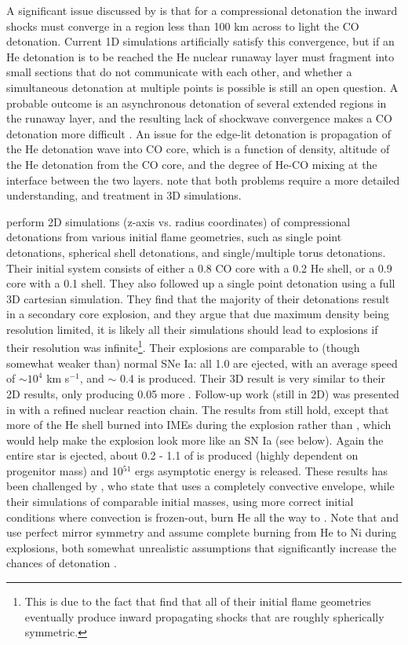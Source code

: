 A significant issue discussed by \citeauthor{woosk10} is that for a compressional detonation the inward shocks must converge in a region less than 100 km across to light the CO detonation.  Current 1D simulations artificially satisfy this convergence, but if an He detonation is to be reached the He nuclear runaway layer must fragment into small sections that do not communicate with each other, and whether a simultaneous detonation at multiple points is possible is still an open question.  A probable outcome is an asynchronous detonation of several extended regions in the runaway layer, and the resulting lack of shockwave convergence makes a CO detonation more difficult \citep{woosk10}.  An issue for the edge-lit detonation is propagation of the He detonation wave into CO core, which is a function of density, altitude of the He detonation from the CO core, and the degree of He-CO mixing at the interface between the two layers.  \citeauthor{woosk10} note that both problems require a more detailed understanding, and treatment in 3D simulations.

\cite{finkhr07} perform 2D simulations (z-axis vs. radius coordinates) of compressional detonations from various initial flame geometries, such as single point detonations, spherical shell detonations, and single/multiple torus detonations.  Their initial system consists of either a 0.8 {\Msun} CO core with a 0.2 {\Msun} He shell, or a  0.9 {\Msun} core with a 0.1 {\Msun} shell.  They also followed up a single point detonation using a full 3D cartesian simulation.  They find that the majority of their detonations result in a secondary core explosion, and they argue that due maximum density being resolution limited, it is likely all their simulations should lead to explosions if their resolution was infinite\footnote{This is due to the fact that \citeauthor{finkhr07} find that all of their initial flame geometries eventually produce inward propagating shocks that are roughly spherically symmetric.}.  Their explosions are comparable to (though somewhat weaker than) normal SNe Ia: all 1.0 {\Msun} are ejected, with an average speed of $\sim 10^4$ km s$^{-1}$, and $\sim$ 0.4 {\Msun} {\Ni} is produced.  Their 3D result is very similar to their 2D results, only producing 0.05 {\Msun} more {\Ni}.  Follow-up work (still in 2D) was presented in \cite{fink+10} with a refined nuclear reaction chain.  The results from \cite{finkhr07} still hold, except that more of the He shell burned into IMEs during the explosion rather than {\Ni}, which would help make the explosion look more like an SN Ia (see below).  Again the entire star is ejected, about 0.2 - 1.1 {\Msun} of {\Ni} is produced (highly dependent on progenitor mass) and 10$^{51}$ ergs asymptotic energy is released.  These results has been challenged by \citeauthor{woosk10}, who state that \citeauthor{fink+10} uses a completely convective envelope, while their simulations of comparable initial masses, using more correct initial conditions where convection is frozen-out, burn He all the way to {\Ni}.  Note that \cite{finkhr07} and \cite{fink+10} use perfect mirror symmetry and assume complete burning from He to Ni during explosions, both somewhat unrealistic assumptions that significantly increase the chances of detonation \citep{guil+10}.

